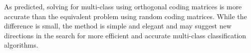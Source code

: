 As predicted, solving for multi-class using orthogonal coding matrices 
is more accurate than the equivalent problem using random coding matrices.
While the difference is small,
the method is simple and elegant and
may suggest new directions in the search for more efficient and
accurate multi-class classification algorithms.

